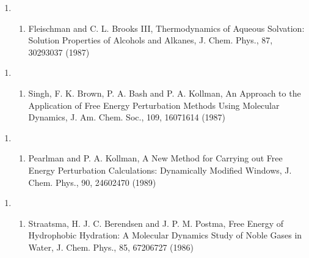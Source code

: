\documentclass[letterpaper,11pt,english]{sphinxmanual}
\begin{document}
\begin{enumerate}
%
\setcounter{enumi}{18}
\item {} \begin{enumerate}
%
\setcounter{enumii}{7}
\item {} 
Fleischman and C. L. Brooks III, Thermodynamics of Aqueous Solvation:  Solution Properties of Alcohols and Alkanes, J. Chem. Phys., 87, 3029\sphinxhyphen{}3037 (1987)

\end{enumerate}

\end{enumerate}
\begin{enumerate}
%
\setcounter{enumi}{20}
\item {} \begin{enumerate}
%
\setcounter{enumii}{2}
\item {} 
Singh, F. K. Brown, P. A. Bash and P. A. Kollman, An Approach to the Application of Free Energy Perturbation Methods Using Molecular Dynamics, J. Am. Chem. Soc., 109, 1607\sphinxhyphen{}1614 (1987)

\end{enumerate}

\end{enumerate}
\begin{enumerate}
%
\setcounter{enumi}{3}
\item {} \begin{enumerate}
%
\item {} 
Pearlman and P. A. Kollman, A New Method for Carrying out Free Energy Perturbation Calculations: Dynamically Modified Windows, J. Chem. Phys., 90, 2460\sphinxhyphen{}2470 (1989)

\end{enumerate}

\end{enumerate}
\begin{enumerate}
%
\setcounter{enumi}{19}
\item {} \begin{enumerate}
%
\setcounter{enumii}{15}
\item {} 
Straatsma, H. J. C. Berendsen and J. P. M. Postma, Free Energy of Hydrophobic Hydration:  A Molecular Dynamics Study of Noble Gases in Water, J. Chem. Phys., 85, 6720\sphinxhyphen{}6727 (1986)

\end{enumerate}

\end{enumerate}
\end{document}
